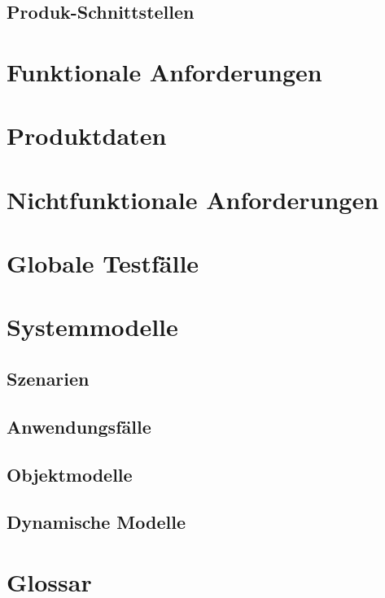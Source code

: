\documentclass[a4paper]{scrreprt}
\begin{document}
\section{Produk-Schnittstellen}

\chapter{Funktionale Anforderungen}

\chapter{Produktdaten}

\chapter{Nichtfunktionale Anforderungen}

\chapter{Globale Testfälle}

\chapter{Systemmodelle}
\section{Szenarien}
\section{Anwendungsfälle}
\section{Objektmodelle}
\section{Dynamische Modelle}

\chapter{Glossar}
 

 

\listoffigures
 
\end{document}
